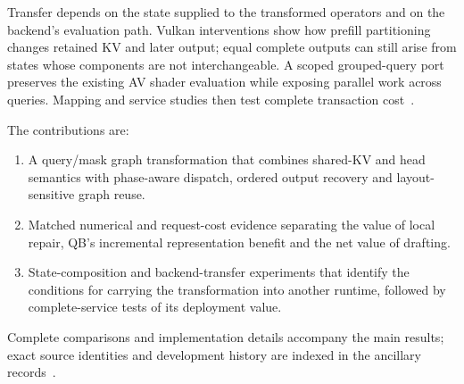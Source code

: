 Transfer depends on the state supplied to the transformed operators and on the backend's evaluation path. Vulkan interventions show how prefill partitioning changes retained KV and later output; equal complete outputs can still arise from states whose components are not interchangeable. A scoped grouped-query port preserves the existing AV shader evaluation while exposing parallel work across queries. Mapping and service studies then test complete transaction cost~\cite{mappingrecords,b570servicerecords,rtxservicerecords}.

The contributions are:
\begin{enumerate}[label=(\arabic*),itemsep=2pt]
\item A query/mask graph transformation that combines shared-KV and head semantics with phase-aware dispatch, ordered output recovery and layout-sensitive graph reuse.
\item Matched numerical and request-cost evidence separating the value of local repair, QB's incremental representation benefit and the net value of drafting.
\item State-composition and backend-transfer experiments that identify the conditions for carrying the transformation into another runtime, followed by complete-service tests of its deployment value.
\end{enumerate}
Complete comparisons and implementation details accompany the main results; exact source identities and development history are indexed in the ancillary records~\cite{studyrecords}.
